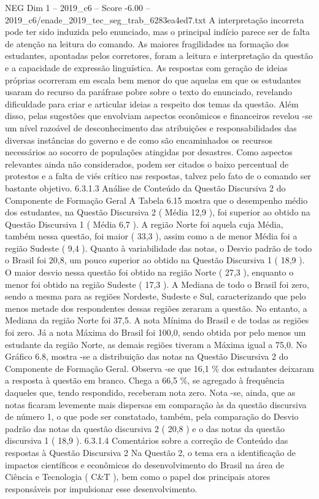 \begin{textsample}{NEG Dim 1 – 2019\_c6 – Score -6.00 – 2019\_c6/enade\_2019\_tec\_seg\_trab\_6283ea4ed7.txt}
A interpretação incorreta pode ter sido induzida pelo enunciado, mas o principal indício parece ser de falta de atenção na leitura do comando.
As maiores fragilidades na formação dos estudantes, apontadas pelos corretores, foram a leitura e interpretação da questão e a capacidade de expressão linguística.
As respostas com geração de ideias próprias ocorreram em escala bem menor do que aquelas em que os estudantes usaram do recurso da paráfrase pobre sobre o texto do enunciado, revelando dificuldade para criar e articular ideias a respeito dos temas da questão.
Além disso, pelas sugestões que envolviam aspectos econômicos e financeiros revelou -se um nível razoável de desconhecimento das atribuições e responsabilidades das diversas instâncias do governo e de como são encaminhados os recursos necessários ao socorro de populações atingidas por desastres.
Como aspectos relevantes ainda não considerados, podem ser citados o baixo percentual de protestos e a falta de viés crítico nas respostas, talvez pelo fato de o comando ser bastante objetivo. 6.3.1.3 Análise de Conteúdo da Questão Discursiva 2 do Componente de Formação Geral A Tabela 6.15 mostra que o desempenho médio dos estudantes, na Questão Discursiva 2 ( Média 12,9 ), foi superior ao obtido na Questão Discursiva 1 ( Média 6,7 ).
A região Norte foi aquela cuja Média, também nessa questão, foi maior ( 33,3 ), assim como a de menor Média foi a região Sudeste ( 9,4 ).
Quanto à variabilidade das notas, o Desvio padrão de todo o Brasil foi 20,8, um pouco superior ao obtido na Questão Discursiva 1 ( 18,9 ).
O maior desvio nessa questão foi obtido na região Norte ( 27,3 ), enquanto o menor foi obtido na região Sudeste ( 17,3 ).
A Mediana de todo o Brasil foi zero, sendo a mesma para as regiões Nordeste, Sudeste e Sul, caracterizando que pelo menos metade dos respondentes dessas regiões zeraram a questão.
No entanto, a Mediana da região Norte foi 37,5.
A nota Mínima do Brasil e de todas as regiões foi zero.
Já a nota Máxima do Brasil foi 100,0, sendo obtida por pelo menos um estudante da região Norte, as demais regiões tiveram a Máxima igual a 75,0.
No Gráfico 6.8, mostra -se a distribuição das notas na Questão Discursiva 2 do Componente de Formação Geral.
Observa -se que 16,1 \% dos estudantes deixaram a resposta à questão em branco.
Chega a 66,5 \%, se agregado à frequência daqueles que, tendo respondido, receberam nota zero.
Nota -se, ainda, que as notas ficaram levemente mais dispersas em comparação às da questão discursiva de número 1, o que pode ser constatado, também, pela comparação do Desvio padrão das notas da questão discursiva 2 ( 20,8 ) e o das notas da questão discursiva 1 ( 18,9 ). 6.3.1.4 Comentários sobre a correção de Conteúdo das respostas à Questão Discursiva 2 Na Questão 2, o tema era a identificação de impactos científicos e econômicos do desenvolvimento do Brasil na área de Ciência e Tecnologia ( C\&T ), bem como o papel dos principais atores responsáveis por impulsionar esse desenvolvimento.

\end{textsample}
